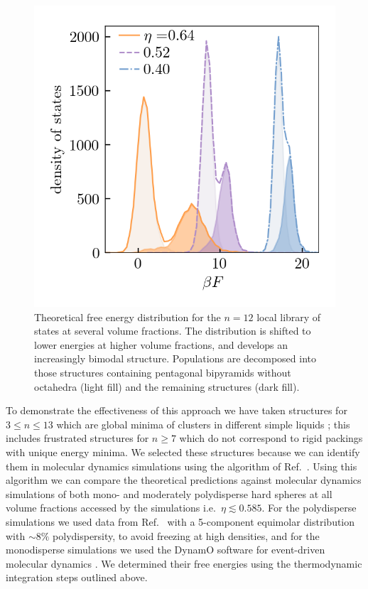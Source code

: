 \documentclass[11pt,twoside]{report}
\begin{document}
\begin{figure}
  \includegraphics[width=0.9\linewidth,outer]{n12-dos}
  \caption[Free energy distribution of 12 particle structures]{
    Theoretical free energy distribution for the $n=12$ local library of states at several volume fractions.
    The distribution is shifted to lower energies at higher volume fractions, and develops an increasingly bimodal structure.
    Populations are decomposed into those structures containing pentagonal bipyramids without octahedra (light fill) and the remaining structures (dark fill).
  }
  \label{fig:n12-dos}
\end{figure}

To demonstrate the effectiveness of this approach we have taken structures for $3 \le n \le 13$ which are global minima of clusters in different simple liquids \cite{Wales2004}; this includes frustrated structures for $n \ge 7$ which do not correspond to rigid packings with unique energy minima.
We selected these structures because we can identify them in molecular dynamics simulations using the algorithm of Ref.\ \cite{MalinsTCC2013}.
Using this algorithm we can compare the theoretical predictions against molecular dynamics simulations of both mono- and moderately polydisperse hard spheres at all volume fractions accessed by the simulations i.e.\ $\eta \lesssim 0.585$.
For the polydisperse simulations we used data from Ref.\ \cite{RoyallJSM2017} with a 5-component equimolar distribution with $\sim8\%$ polydispersity, to avoid freezing at high densities, and for the monodisperse simulations we used the DynamO software for event-driven molecular dynamics \cite{BannermanJCC2011}.
We determined their free energies using the thermodynamic integration steps outlined above.
\end{document}
